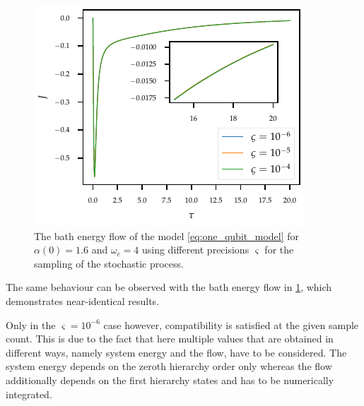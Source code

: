 \begin{figure}
  \centering
  \includegraphics{figs/one_bath_syst/stocproc_systematics_flow}
  \caption{\label{fig:stocprocflow}The bath energy flow of the model
    \cref{eq:one_qubit_model} for \(α(0)=1.6\) and \(ω_c=4\) using
    different precisions \(\varsigma\) for the sampling of the
    stochastic process.}
\end{figure}
The same behaviour can be observed with the bath energy flow in
\cref{fig:stocprocflow}, which demonstrates near-identical results.

Only in the \(\varsigma=10^{-6}\) case however, compatibility is
satisfied at the given sample count. This is due to the fact that here
multiple values that are obtained in different ways, namely system
energy and the flow, have to be considered. The system energy depends
on the zeroth hierarchy order only whereas the flow additionally
depends on the first hierarchy states and has to be numerically
integrated.

